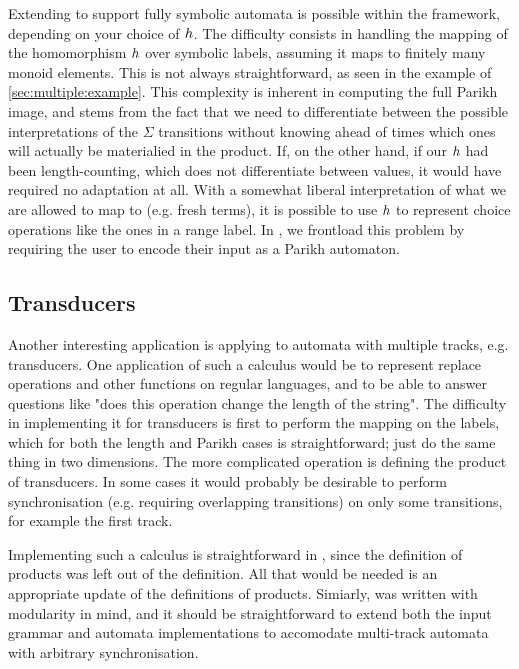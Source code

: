 \documentclass[acmsmall,review,anonymous,screen]{acmart}\settopmatter{printfolios=true,printccs=false,printacmref=true}
\theoremstyle{definition}
\begin{document}
Extending \Calculus{} to support fully symbolic automata is possible within the
framework, depending on your choice of $h$. The difficulty consists in
handling the mapping of the homomorphism $h$ over symbolic labels, assuming
it maps to finitely many monoid elements. This is not always straightforward, as
seen in the example of \cref{sec:multiple:example}. This complexity is inherent
in computing the full Parikh image, and stems from the fact that we need to
differentiate between the possible interpretations of the $\Sigma$ transitions
without knowing ahead of times which ones will actually be materialied in the
product. If, on the other hand, if our $h$ had been length-counting, which
does not differentiate between values, it would have required no adaptation at
all. With a somewhat liberal interpretation of what we are allowed to map to
(e.g. fresh terms), it is possible to use $h$ to represent choice operations
like the ones in a range label. In \Catra{}, we frontload this problem by
requiring the user to encode their input as a Parikh automaton. 

\subsection{Transducers}\label{sec:ext:transducers}

Another interesting application is applying \Calculus{} to automata with
multiple tracks, e.g. transducers. One application of such a calculus would be
to represent replace operations and other functions on regular languages, and to
be able to answer questions like "does this operation change the length of the
string". The difficulty in implementing it for transducers is first to perform
the mapping on the labels, which for both the length and Parikh cases is
straightforward; just do the same thing in two dimensions. The more complicated
operation is defining the product of transducers. In some cases it would
probably be desirable to perform synchronisation (e.g. requiring overlapping
transitions) on only some transitions, for example the first track.

Implementing such a calculus is straightforward in \Calculus, since the
definition of products was left out of the definition. All that would be needed
is an appropriate update of the definitions of products. Simiarly, \Catra was
written with modularity in mind, and it should be straightforward to extend both
the input grammar and automata implementations to accomodate multi-track
automata with arbitrary synchronisation.
\end{document}
